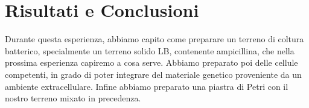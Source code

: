 \section{Risultati e Conclusioni}

Durante questa esperienza, abbiamo capito come preparare un terreno di coltura batterico,
specialmente un terreno solido LB, contenente ampicillina,
che nella prossima esperienza capiremo a cosa serve.
Abbiamo preparato poi delle cellule competenti,
in grado di poter integrare del materiale genetico proveniente da un ambiente extracellulare.
Infine abbiamo preparato una piastra di Petri con il nostro terreno mixato in precedenza.
